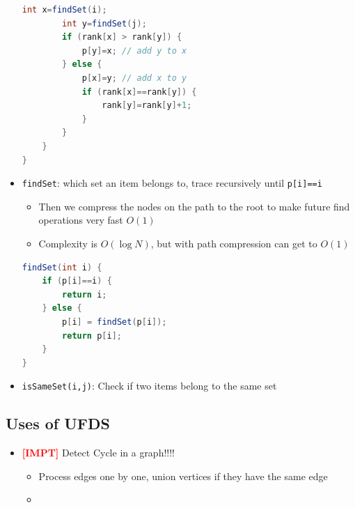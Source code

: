 \documentclass{article}
\newcommand{\impt}[0]{\textcolor{red}{\textbf{[IMPT] }}}
\begin{document}
\begin{multicols}{2}
\begin{itemize}
\begin{lstlisting}[language=Java]
		int x=findSet(i);
		int y=findSet(j);
		if (rank[x] > rank[y]) {
			p[y]=x; // add y to x
		} else {
		    p[x]=y; // add x to y
		    if (rank[x]==rank[y]) {
		    	rank[y]=rank[y]+1;
		    }
	    }
	}
}
\end{lstlisting}
	\item \texttt{findSet}: which set an item belongs to, trace recursively until \texttt{p[i]==i}
	\begin{itemize}
		\item Then we compress the nodes on the path to the root to make future find operations very fast $O(1)$
		\item Complexity is $O(\log{N})$, but with path compression can get to $O(1)$
	\end{itemize}
\begin{lstlisting}[language=Java]
findSet(int i) {
	if (p[i]==i) {
		return i;
	} else {
		p[i] = findSet(p[i]);
		return p[i];
	}
}
\end{lstlisting}
	\item \texttt{isSameSet(i,j)}: Check if two items belong to the same set
\end{itemize}
\subsection{Uses of UFDS}
\begin{itemize}
	\item \impt Detect Cycle in a graph!!!!
	\begin{itemize}
		\item Process edges one by one, union vertices if they have the same edge
		\item
	\end{itemize}
\end{itemize}


\end{multicols}
\end{document}
